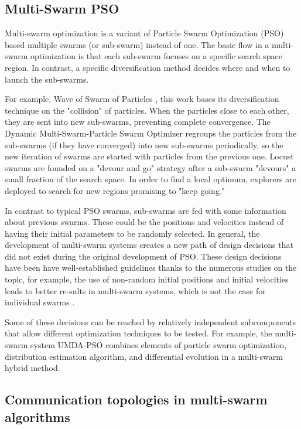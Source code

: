 \documentclass[runningheads]{llncs}
\begin{document}
\subsection{Multi-Swarm PSO}

Multi-swarm optimization is a variant of Particle Swarm Optimization (PSO) based  multiple swarms (or sub-swarm) instead of one. The basic flow in a multi-swarm optimization is that each sub-swarm focuses on a specific search space region. In contrast, a specific diversification method decides where and when to launch the sub-swarms. 

For example, Wave of Swarm of Particles \cite{b6}, this work bases its diversification technique on the "collision" of particles. When the particles close to each other, they are sent into new sub-swarms, preventing complete convergence. The Dynamic Multi-Swarm-Particle Swarm Optimizer\cite{b7} regroups the particles from the sub-swarms (if they have converged) into new sub-swarms periodically, so the new iteration of swarms are started with particles from the previous one. Locust swarms \cite{b8} are founded on a "devour and go" strategy after a sub-swarm "devours" a small fraction of the search space. In order to find a local optimum, explorers are deployed to search for new regions promising to "keep going."

In contrast to typical PSO swarms, sub-swarms are fed with some information about previous swarms. These could be the positions and velocities instead of having their initial parameters to be randomly selected. In general, the development of multi-swarm systems creates a new path of design decisions that did not exist during the original development of PSO. These design decisions have been have well-established guidelines thanks to the numerous studies on the topic, for example, the use of non-random initial positions and initial velocities leads to better re-sults in multi-swarm systems, which is not the case for individual swarms \cite{b9}.

Some of these decisions can be reached by relatively independent subcomponents that allow different optimization techniques to be tested. For example, the multi-swarm system UMDA-PSO \cite{b10} combines elements of particle swarm optimization, distribution estimation algorithm, and differential evolution in a multi-swarm hybrid method.



\subsection{Communication topologies in multi-swarm algorithms}
\end{document}
